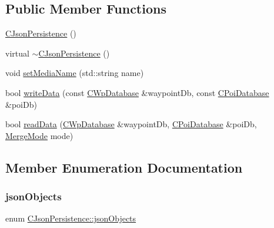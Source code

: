 \subsection*{Public Member Functions}
\begin{DoxyCompactItemize}
\item 
\hyperlink{classCJsonPersistence_a4ecc6567fdd9d7f76ea3f53bbfd27a04}{C\+Json\+Persistence} ()
\item 
virtual \hyperlink{classCJsonPersistence_a4540b65d9b71826f3efa0342e9dc0f08}{$\sim$\+C\+Json\+Persistence} ()
\item 
void \hyperlink{classCJsonPersistence_a857d2c1a5de0f3fafceef1266e32a25d}{set\+Media\+Name} (std\+::string name)
\item 
bool \hyperlink{classCJsonPersistence_acd18e844bf7ec52ba1ec265ea2767dcb}{write\+Data} (const \hyperlink{classCWpDatabase}{C\+Wp\+Database} \&waypoint\+Db, const \hyperlink{classCPoiDatabase}{C\+Poi\+Database} \&poi\+Db)
\item 
bool \hyperlink{classCJsonPersistence_a433ddbf7f66175f38f549dbedcbb1e93}{read\+Data} (\hyperlink{classCWpDatabase}{C\+Wp\+Database} \&waypoint\+Db, \hyperlink{classCPoiDatabase}{C\+Poi\+Database} \&poi\+Db, \hyperlink{classCPersistentStorage_a9b9929a4afa6e21da10f4a2e926a4584}{Merge\+Mode} mode)
\end{DoxyCompactItemize}


\subsection{Member Enumeration Documentation}
\mbox{\label{classCJsonPersistence_a32c7998a8554b336a0d7f44e10686525}} 
\subsubsection{\texorpdfstring{json\+Objects}{jsonObjects}}
{\footnotesize\ttfamily enum \hyperlink{classCJsonPersistence_a32c7998a8554b336a0d7f44e10686525}{C\+Json\+Persistence\+::json\+Objects}}

